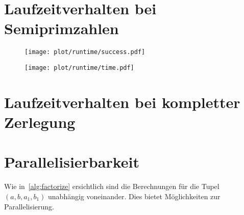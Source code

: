 \section{Laufzeitverhalten bei Semiprimzahlen}
\begin{figure}[ht]
		\centering
		\texttt{[image: plot/runtime/success.pdf]}
\end{figure}
\begin{figure}[ht]
		\centering
		\texttt{[image: plot/runtime/time.pdf]}
\end{figure}

\section{Laufzeitverhalten bei kompletter Zerlegung}

\section{Parallelisierbarkeit}\label{sec:parallel}
Wie in~\ref{alg:factorize} ersichtlich sind die Berechnungen für die Tupel $\left(a, b, a_1, b_1\right)$ unabhängig voneinander. Dies bietet Möglichkeiten zur Parallelisierung.
